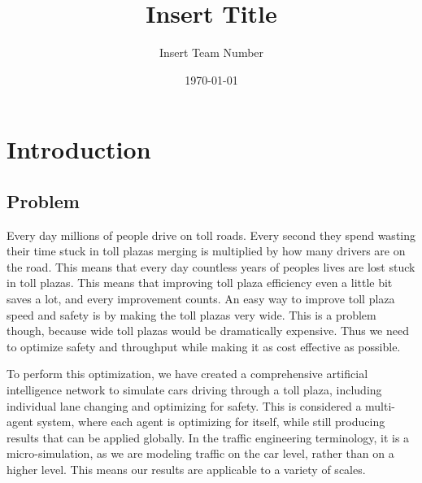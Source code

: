 \documentclass[a4paper, 11pt]{article}
\title{Insert Title}
\author{Insert Team Number}
\date{\today}
\begin{document}
\tableofcontents
\newpage
\thispagestyle{firststyle}





%   
%
%







\section{Introduction}
\subsection{Problem}

Every day millions of people drive on toll roads. Every second they spend wasting their time stuck in toll plazas merging is multiplied by how many drivers are on the road. This means that every day countless years of peoples lives are lost stuck in toll plazas. This means that improving toll plaza efficiency even a little bit saves a lot, and every improvement counts. An easy way to improve toll plaza speed and safety is by making the toll plazas very wide. This is a problem though, because wide toll plazas would be dramatically expensive. Thus we need to optimize safety and throughput while making it as cost effective as possible. 

To perform this optimization, we have created a comprehensive artificial intelligence network to simulate cars driving through a toll plaza, including individual lane changing and optimizing for safety. This is considered a multi-agent system, where each agent is optimizing for itself, while still producing results that can be applied globally. In the traffic engineering terminology, it is a micro-simulation, as we are modeling traffic on the car level, rather than on a higher level. This means our results are applicable to a variety of scales. 
\end{document}
